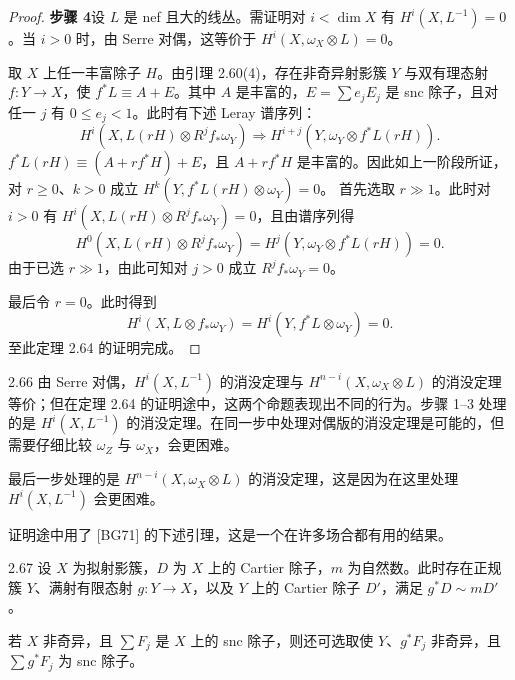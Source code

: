 \begin{proof}
\textbf{步骤 4}\quad 设 $L$ 是 nef 且大的线丛。需证明对 $i<\dim X$ 有 $H^i(X,L^{-1})=0$。当 $i>0$ 时，由 Serre 对偶，这等价于 $H^i(X,\omega_X\otimes L)=0$。

取 $X$ 上任一丰富除子 $H$。由引理 2.60(4)，存在非奇异射影簇 $Y$ 与双有理态射 $f:Y\to X$，使 $f^*L\equiv A+E$。其中 $A$ 是丰富的，$E=\sum e_jE_j$ 是 snc 除子，且对任一 $j$ 有 $0\le e_j<1$。此时有下述 Leray 谱序列：
\[
H^i(X,L(rH)\otimes R^jf_*\omega_Y)\Rightarrow H^{i+j}(Y,\omega_Y\otimes f^*L(rH)).
\]
$f^*L(rH)\equiv(A+rf^*H)+E$，且 $A+rf^*H$ 是丰富的。因此如上一阶段所证，对 $r\ge 0$、$k>0$ 成立 $H^k(Y,f^*L(rH)\otimes\omega_Y)=0$。
首先选取 $r\gg 1$。此时对 $i>0$ 有 $H^i(X,L(rH)\otimes R^jf_*\omega_Y)=0$，且由谱序列得
\[
H^0(X,L(rH)\otimes R^jf_*\omega_Y)=H^j(Y,\omega_Y\otimes f^*L(rH))=0.
\]
由于已选 $r\gg 1$，由此可知对 $j>0$ 成立 $R^jf_*\omega_Y=0$。

最后令 $r=0$。此时得到
\[
H^i(X,L\otimes f_*\omega_Y)=H^i(Y,f^*L\otimes\omega_Y)=0.
\]
至此定理 2.64 的证明完成。
\end{proof}

\begin{remark}{2.66}
由 Serre 对偶，$H^i(X,L^{-1})$ 的消没定理与 $H^{n-i}(X,\omega_X\otimes L)$ 的消没定理等价；但在定理 2.64 的证明途中，这两个命题表现出不同的行为。步骤 1–3 处理的是 $H^i(X,L^{-1})$ 的消没定理。在同一步中处理对偶版的消没定理是可能的，但需要仔细比较 $\omega_Z$ 与 $\omega_X$，会更困难。

最后一步处理的是 $H^{n-i}(X,\omega_X\otimes L)$ 的消没定理，这是因为在这里处理 $H^i(X,L^{-1})$ 会更困难。
\end{remark}

证明途中用了 [BG71] 的下述引理，这是一个在许多场合都有用的结果。

\begin{propositionp}{2.67}
设 $X$ 为拟射影簇，$D$ 为 $X$ 上的 Cartier 除子，$m$ 为自然数。此时存在正规簇 $Y$、满射有限态射 $g:Y\to X$，以及 $Y$ 上的 Cartier 除子 $D'$，满足 $g^*D\sim mD'$。

若 $X$ 非奇异，且 $\sum F_j$ 是 $X$ 上的 snc 除子，则还可选取使 $Y$、$g^*F_j$ 非奇异，且 $\sum g^*F_j$ 为 snc 除子。
\end{propositionp}

